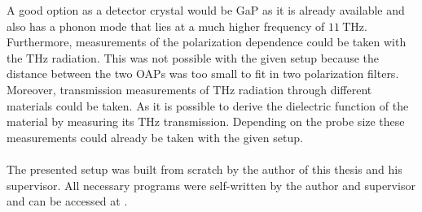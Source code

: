 A good option as a detector crystal would be GaP as it is already available and also has a phonon mode that lies at a much higher frequency of $\SI{11}{\tera\hertz}$.
\\
Furthermore, measurements of the polarization dependence could be taken with the $\si{\tera\hertz}$ radiation.
This was not possible with the given setup because the distance between the two OAPs was too small to fit in two polarization filters.
Moreover, transmission measurements of $\si{\tera\hertz}$ radiation through different materials could be taken.
As it is possible to derive the dielectric function of the material by measuring its $\si{\tera\hertz}$ transmission.
Depending on the probe size these measurements could already be taken with the given setup.
\\\\
The presented setup was built from scratch by the author of this thesis and his supervisor.
All necessary programs were self-written by the author and supervisor and can be accessed at \cite{github}.